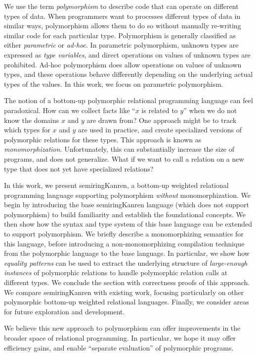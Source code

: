\documentclass{report}
\theoremstyle{definition}
\begin{document}
We use the term \emph{polymorphism} to describe code that can operate on different types of data.
When programmers want to processes different types of data in similar ways, polymorphism allows them to do so without manually re-writing similar code for each particular type.
Polymorphism is generally classified as either \emph{parametric} or \emph{ad-hoc}.
In parametric polymorphism, unknown types are expressed as \emph{type variables}, and direct operations on values of unknown types are prohibited.
Ad-hoc polymorphism does allow operations on values of unknown types, and these operations behave differently depending on the underlying actual types of the values.
In this work, we focus on parametric polymorphism.

The notion of a bottom-up polymorphic relational programming language can feel paradoxical.
How can we collect facts like ``\(x\) is related to \(y\)'' when we do not know the domains \(x\) and \(y\) are drawn from?
One approach might be to track which types for \(x\) and \(y\) are used in practice, and create specialized versions of polymorphic relations for these types.
This approach is known as \emph{monomorphization}.
Unfortunately, this can substantially increase the size of programs, and does not generalize.
What if we want to call a relation on a new type that does not yet have specialized relations?

In this work, we present semiringKanren, a bottom-up weighted relational programming language supporting polymorphism \emph{without} monomorphization.
We begin by introducing the base semiringKanren language (which does not support polymorphism) to build familiarity and establish the foundational concepts.
We then show how the syntax and type system of this base language can be extended to support polymorphism.
We briefly describe a monomorphizing semantics for this language, before introducing a non-monomorphizing compilation technique from the polymorphic language to the base language.
In particular, we show how \emph{equality patterns} can be used to extract the underlying structure of \emph{large-enough instances} of polymorphic relations
to handle polymorphic relation calls at different types.
We conclude the section with correctness proofs of this approach.
We compare semiringKanren with existing work, focusing particularly on other polymorphic bottom-up weighted relational languages.
Finally, we consider areas for future exploration and development.

We believe this new approach to polymorphism can offer improvements in the broader space of relational programming.
In particular, we hope it may offer efficiency gains, and enable ``separate evaluation'' of polymorphic programs.
\end{document}
